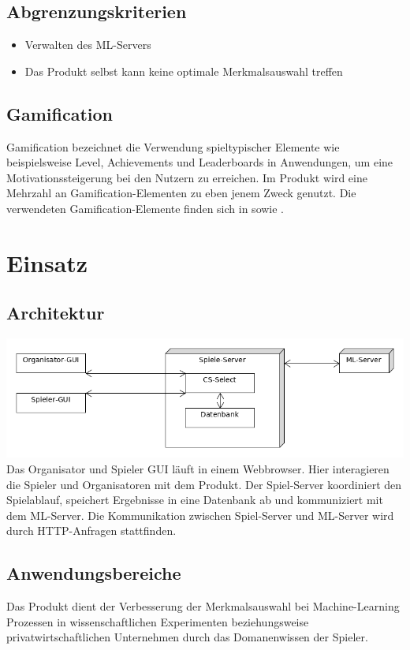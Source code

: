 \documentclass[a4paper]{scrreprt}
\begin{document}
    \section{Abgrenzungskriterien}
    \begin{itemize}
        \item Verwalten des \Gls{ML-Server}s
	    \item Das Produkt selbst kann keine optimale Merkmalsauswahl treffen
    \end{itemize}

    \section{Gamification}
    \label{sec:gamification}
    Gamification bezeichnet die Verwendung spieltypischer Elemente wie beispielsweise Level, Achievements und Leaderboards in Anwendungen, um eine Motivationssteigerung bei den Nutzern zu erreichen.
    Im \Gls{Produkt} wird eine Mehrzahl an Gamification-Elementen zu eben jenem Zweck genutzt.
    Die verwendeten Gamification-Elemente finden sich in  sowie .

    
    \chapter{Einsatz}

    \section{Architektur}
    \includegraphics[width=\textwidth]{uml/export/Architektur.png}
    Das Organisator und Spieler GUI läuft in einem \Gls{Webbrowser}.
    Hier interagieren die Spieler und Organisatoren mit dem \Gls{Produkt}.
    Der \Gls{Spiel-Server} koordiniert den Spielablauf, speichert Ergebnisse
    in eine Datenbank ab und kommuniziert mit dem ML-Server.
    Die Kommunikation zwischen \Gls{Spiel-Server} und ML-Server wird durch HTTP-Anfragen stattfinden.
    \section{Anwendungsbereiche}
    Das \Gls{Produkt} dient der Verbesserung der Merkmalsauswahl bei Machine-Learning Prozessen in wissenschaftlichen
    Experimenten beziehungsweise privatwirtschaftlichen Unternehmen durch das \Gls{Domanenwissen} der \Gls{Spieler}.
\end{document}

